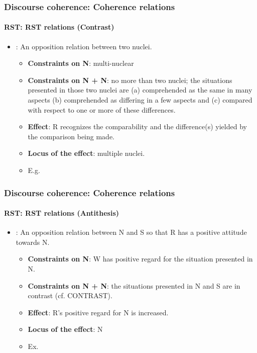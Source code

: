 \documentclass[xcolor=table]{beamer}
\begin{document}
\begin{frame}
	\frametitle{Discourse coherence: Coherence relations}
	\framesubtitle{RST: RST relations (Contrast)}
	
	\begin{itemize}
		\item {}: An opposition relation between two nuclei.
		\begin{itemize}
			\item \textbf{Constraints on N}: multi-nuclear
			\item \textbf{Constraints on N + N}: no more than two nuclei; the situations presented in those two nuclei are (a) comprehended as the same in many aspects (b) comprehended as differing in a few aspects and (c) compared with respect to one or more of these differences.
			\item \textbf{Effect}: R recognizes the comparability and the difference(s) yielded by the comparison being made.
			\item \textbf{Locus of the effect}: multiple nuclei.
			\item E.g. 
		\end{itemize}
	\end{itemize}
	
\end{frame}

\begin{frame}
	\frametitle{Discourse coherence: Coherence relations}
	\framesubtitle{RST: RST relations (Antithesis)}
	
	\begin{itemize}
		\item {}: An opposition relation between N and S so that R has a positive attitude towards N.
		\begin{itemize}
			\item \textbf{Constraints on N}: W has positive regard for the situation presented in N.
			\item \textbf{Constraints on N + N}: the situations presented in N and S are in contrast (cf. CONTRAST).
			\item \textbf{Effect}: R's positive regard for N is increased.
			\item \textbf{Locus of the effect}: N
			\item Ex. 
		\end{itemize}
	\end{itemize}
	
\end{frame}
\end{document}
